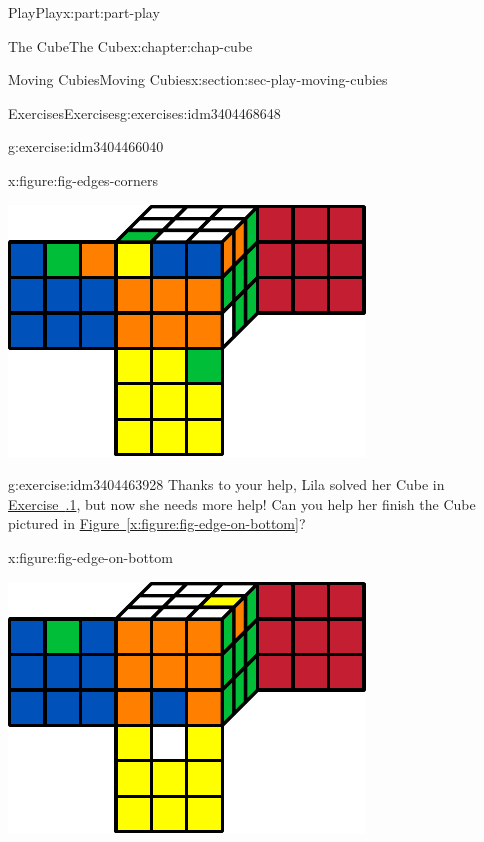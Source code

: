 \documentclass[oneside,10pt,]{book}
\newcommand{\xreffont}{\relax}
\numberwithin{equation}{section}
\begin{document}
\begin{partptx}{Play}{}{Play}{}{}{x:part:part-play}
\begin{chapterptx}{The Cube}{}{The Cube}{}{}{x:chapter:chap-cube}
\begin{sectionptx}{Moving Cubies}{}{Moving Cubies}{}{}{x:section:sec-play-moving-cubies}
\begin{exercises-subsection-numberless}{Exercises}{}{Exercises}{}{}{g:exercises:idm3404468648}
\begin{divisionexercise}{2}{}{}{g:exercise:idm3404466040}
\begin{figureptx}{}{x:figure:fig-edges-corners}{}
\begin{image}{0.25}{0.5}{0.25}
\includegraphics[width=\linewidth]{./images/edges-corners.pdf}
\end{image}%
\tcblower
\end{figureptx}%
\end{divisionexercise}%
\begin{divisionexercise}{3}{}{}{g:exercise:idm3404463928}%
Thanks to your help, Lila solved her Cube in \hyperlink{x:exercise:exer-scrambled-edges}{Exercise~{\xreffont 1.3.1}}, but now she needs more help! Can you help her finish the Cube pictured in \hyperref[x:figure:fig-edge-on-bottom]{Figure~{\xreffont\ref{x:figure:fig-edge-on-bottom}}}?%
\begin{figureptx}{}{x:figure:fig-edge-on-bottom}{}%
\begin{image}{0.25}{0.5}{0.25}%
\includegraphics[width=\linewidth]{./images/edge_on_bottom.pdf}

\end{image}
\end{figureptx}
\end{divisionexercise}
\end{exercises-subsection-numberless}
\end{sectionptx}
\end{chapterptx}
\end{partptx}
\end{document}
